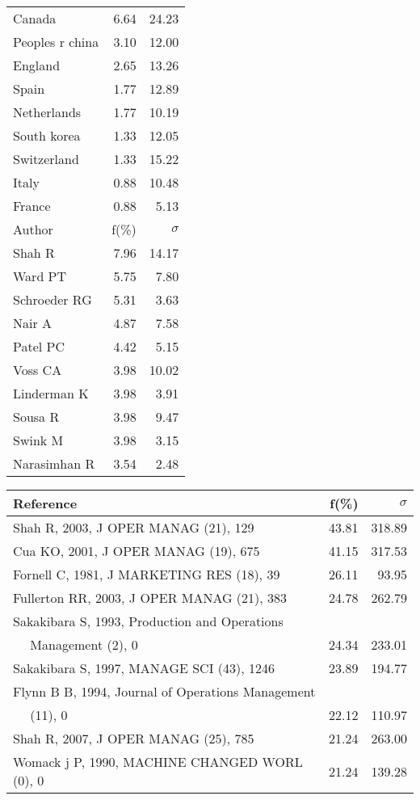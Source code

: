 \documentclass[a4paper,11pt]{report}
\begin{document}
\begin{landscape}
\begin{table}[!ht]
{\begin{tabular}{|l r r|}
Canada & 6.64 & 24.23\\
Peoples r china & 3.10 & 12.00\\
England & 2.65 & 13.26\\
Spain & 1.77 & 12.89\\
Netherlands & 1.77 & 10.19\\
South korea & 1.33 & 12.05\\
Switzerland & 1.33 & 15.22\\
Italy & 0.88 & 10.48\\
France & 0.88 & 5.13\\
\hline
\hline
Author & f(\%) & $\sigma$\\
\hline
Shah R & 7.96 & 14.17\\
Ward PT & 5.75 & 7.80\\
Schroeder RG & 5.31 & 3.63\\
Nair A & 4.87 & 7.58\\
Patel PC & 4.42 & 5.15\\
Voss CA & 3.98 & 10.02\\
Linderman K & 3.98 & 3.91\\
Sousa R & 3.98 & 9.47\\
Swink M & 3.98 & 3.15\\
Narasimhan R & 3.54 & 2.48\\
\hline
\end{tabular}
}
{\scriptsize\begin{tabular}{|l r r|}
\hline
Reference & f(\%) & $\sigma$\\
\hline
Shah R, 2003, J OPER MANAG (21), 129 & 43.81 & 318.89\\
Cua KO, 2001, J OPER MANAG (19), 675 & 41.15 & 317.53\\
Fornell C, 1981, J MARKETING RES (18), 39 & 26.11 & 93.95\\
Fullerton RR, 2003, J OPER MANAG (21), 383 & 24.78 & 262.79\\
Sakakibara S, 1993, Production and Operations &  & \\
$\quad$ Management (2), 0 & 24.34 & 233.01\\
Sakakibara S, 1997, MANAGE SCI (43), 1246 & 23.89 & 194.77\\
Flynn B B, 1994, Journal of Operations Management &  & \\
$\quad$ (11), 0 & 22.12 & 110.97\\
Shah R, 2007, J OPER MANAG (25), 785 & 21.24 & 263.00\\
Womack j P, 1990, MACHINE CHANGED WORL (0), 0 & 21.24 & 139.28\\

\end{tabular}}
\end{table}
\end{landscape}
\end{document}

